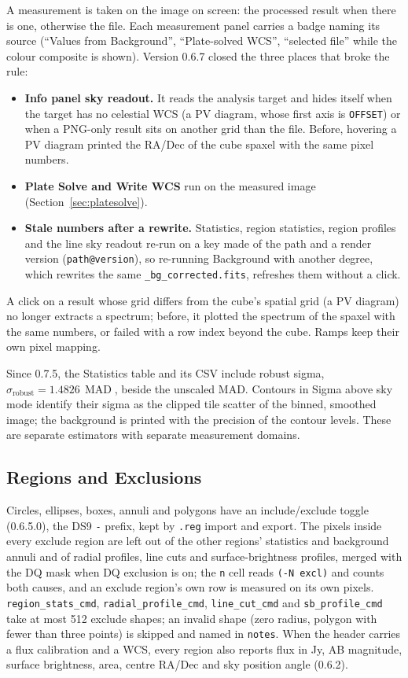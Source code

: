 \documentclass[11pt,a4paper]{article}
\newcommand{\code}[1]{\texttt{\small #1}}
\begin{document}
    A measurement is taken on the image on screen: the processed result when there is one, otherwise the file. Each measurement panel carries a badge naming its source (``Values from Background'', ``Plate-solved WCS'', ``selected file'' while the colour composite is shown). Version 0.6.7 closed the three places that broke the rule:
    \begin{itemize}[nosep]
    \item \textbf{Info panel sky readout.} It reads the analysis target and hides itself when the target has no celestial WCS (a PV diagram, whose first axis is \code{OFFSET}) or when a PNG-only result sits on another grid than the file. Before, hovering a PV diagram printed the RA/Dec of the cube spaxel with the same pixel numbers.
    \item \textbf{Plate Solve and Write WCS} run on the measured image (Section~\ref{sec:platesolve}).
    \item \textbf{Stale numbers after a rewrite.} Statistics, region statistics, region profiles and the line sky readout re-run on a key made of the path and a render version (\code{path@version}), so re-running Background with another degree, which rewrites the same \code{\_bg\_corrected.fits}, refreshes them without a click.
    \end{itemize}
    A click on a result whose grid differs from the cube's spatial grid (a PV diagram) no longer extracts a spectrum; before, it plotted the spectrum of the spaxel with the same numbers, or failed with a row index beyond the cube. Ramps keep their own pixel mapping.

    Since 0.7.5, the Statistics table and its CSV include robust sigma, $\sigma_{\mathrm{robust}} = 1.4826\,\operatorname{MAD}$, beside the unscaled MAD. Contours in Sigma above sky mode identify their sigma as the clipped tile scatter of the binned, smoothed image; the background is printed with the precision of the contour levels. These are separate estimators with separate measurement domains.

    \subsection{Regions and Exclusions}

    Circles, ellipses, boxes, annuli and polygons have an include/exclude toggle (0.6.5.0), the DS9 \code{-} prefix, kept by \code{.reg} import and export. The pixels inside every exclude region are left out of the other regions' statistics and background annuli and of radial profiles, line cuts and surface-brightness profiles, merged with the DQ mask when DQ exclusion is on; the \code{n} cell reads \code{(-N excl)} and counts both causes, and an exclude region's own row is measured on its own pixels. \code{region\_stats\_cmd}, \code{radial\_profile\_cmd}, \code{line\_cut\_cmd} and \code{sb\_profile\_cmd} take at most 512 exclude shapes; an invalid shape (zero radius, polygon with fewer than three points) is skipped and named in \code{notes}. When the header carries a flux calibration and a WCS, every region also reports flux in Jy, AB magnitude, surface brightness, area, centre RA/Dec and sky position angle (0.6.2).
\end{document}

